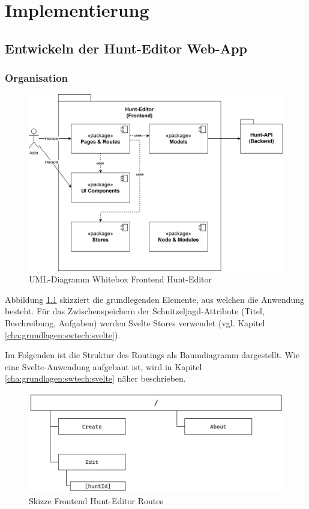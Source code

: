 \chapter{Implementierung} \label{cha:implementierung}

\section{Entwickeln der Hunt-Editor Web-App}

\subsection{Organisation}

\begin{figure}[H]
  \centering
  \includegraphics[width=1\textwidth]{images/PrAR-Loesung-Hunt-Editor-Components.png}
  \caption{UML-Diagramm Whitebox Frontend Hunt-Editor}
  \label{fig:whitebox-frontend}
\end{figure}

Abbildung \ref{fig:whitebox-frontend} skizziert die grundlegenden Elemente, aus welchen die Anwendung besteht. Für das Zwischenspeichern der Schnitzeljagd-Attribute (Titel, Beschreibung, Aufgaben) werden Svelte Stores verwendet (vgl. Kapitel \ref{cha:grundlagen:swtech:svelte}).

Im Folgenden ist die Struktur des Routings als Baumdiagramm dargestellt. Wie eine Svelte-Anwendung aufgebaut ist, wird in Kapitel \ref{cha:grundlagen:swtech:svelte} näher beschrieben.

\begin{figure}[H]
  \centering
  \includegraphics[width=1\textwidth]{images/PrAR-Loesung-Hunt-Editor-Routes.png}
  \caption{Skizze Frontend Hunt-Editor Routes}
  \label{fig:frontend-routes}
\end{figure}

